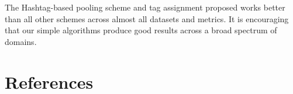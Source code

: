 \documentclass[10pt,a5paper,twoside]{article}
\begin{document}
The Hashtag-based pooling scheme and tag assignment proposed works better than all other schemes across almost all datasets and metrics. It is encouraging that our simple algorithms produce good results across a broad spectrum of domains.

\section*{References}
%


%
%




%
%




\nocite{*}
%



\end{document}
